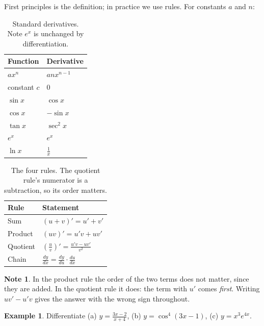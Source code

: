 \documentclass[11pt,a4paper]{article}
\theoremstyle{definition}
\newtheorem{example}[thm]{Example}
\newtheorem{note}[thm]{Note}
\begin{document}
First principles is the definition; in practice we use rules. For constants $a$ and $n$:

\begin{table}[H]
\centering
\begin{tabular}{|l|l|}
\hline
Function & Derivative\\
\hline
$ax^n$ & $anx^{n-1}$\\
constant $c$ & $0$\\
$\sin x$ & $\cos x$\\
$\cos x$ & $-\sin x$\\
$\tan x$ & $\sec^2x$\\
$e^x$ & $e^x$\\
$\ln x$ & $\frac{1}{x}$\\
\hline
\end{tabular}
\caption{Standard derivatives. Note $e^x$ is unchanged by differentiation.}
\end{table}

\begin{table}[H]
\centering
\begin{tabular}{|l|l|}
\hline
Rule & Statement\\
\hline
Sum & $(u+v)'=u'+v'$\\
Product & $(uv)'=u'v+uv'$\\
Quotient & $\left(\frac{u}{v}\right)'=\frac{u'v-uv'}{v^2}$\\
Chain & $\frac{dy}{dx}=\frac{dy}{du}\cdot\frac{du}{dx}$\\
\hline
\end{tabular}
\caption{The four rules. The quotient rule's numerator is a subtraction, so its order matters.}
\end{table}

\begin{note}
In the product rule the order of the two terms does not matter, since they are added.
In the quotient rule it does: the term with $u'$ comes \emph{first}. Writing
$uv'-u'v$ gives the answer with the wrong sign throughout.
\end{note}

\begin{example}
Differentiate (a) $y=\frac{3x-2}{x+4}$, \quad (b) $y=\cos^4(3x-1)$, \quad
(c) $y=x^3e^{4x}$.
\end{example}
\end{document}
